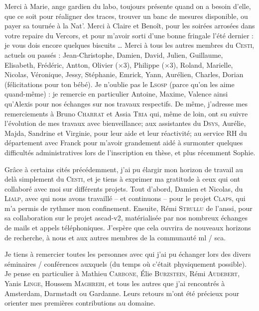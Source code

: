Merci à Marie, ange gardien du labo, toujours présente quand on a besoin d'elle, que ce soit pour réaligner des traces, trouver un banc de mesures disponible, ou payer sa tournée à la Nat'.
Merci à Claire et Benoît, pour les soirées arrosées dans votre repaire du Vercors, et pour m'avoir sorti d'une bonne fringale l'été dernier : je vous dois encore quelques biscuits \ldots
Merci à tous les autres membres du \textsc{Cesti}, actuels ou passés : Jean-Christophe, Damien, David, Julien, Guillaume, Elisabeth, Frédéric, Antton, Olivier (\(\times 3\)), Philippe (\(\times 3\)), Roland, Marielle, Nicolas, Véronique, Jessy, Stéphanie, Emrick, Yann, Aurélien, Charles, Dorian (félicitations pour ton bébé).
Je n'oublie pas le \textsc{Lsosp} (parce qu'on les aime quand-même) : je remercie en particulier Antoine, Maxime, Valence ainsi qu'Alexis pour nos échanges sur nos travaux respectifs.
De même, j'adresse mes remerciements à Bruno \textsc{Charrat} et Assia \textsc{Tria} qui, même de loin, ont su suivre l'évolution de mes travaux avec bienveillance; aux assistantes du \textsc{Dsys}, Aurélie, Majda, Sandrine et Virginie, pour leur aide et leur réactivité; au service RH du département avec Franck pour m'avoir grandement aidé à surmonter quelques difficultés administratives lors de l'inscription en thèse, et plus récemment Sophie.

Grâce à certains cités précédemment, j'ai pu élargir mon horizon de travail au delà simplement du \textsc{Cesti}, et je tiens à exprimer ma gratitude à ceux qui ont collaboré avec moi sur différents projets.
Tout d'abord, Damien et Nicolas, du \textsc{Lialp}, avec qui nous avons travaillé -- et continuons -- pour le projet \textsc{Claps}, qui m'a permis de rythmer mon confinement.
Ensuite, Rémi \textsc{Strullu} de l'\acrshort{anssi}, pour sa collaboration sur le projet \acrshort{ascad}-v2, matérialisée par nos nombreux échanges de mails et appels téléphoniques.
J'espère que cela ouvrira de nouveaux horizons de recherche, à nous et aux autres membres de la communauté \acrshort{ml} / \acrshort{sca}.

Je tiens à remercier toutes les personnes avec qui j'ai pu échanger lors des divers séminaires / conférences auxquels (du temps où c'était physiquement possible).
Je pense en particulier à Mathieu \textsc{Carbone}, Élie \textsc{Burzstein}, Rémi \textsc{Audebert}, Yanis \textsc{Linge}, Houssem \textsc{Maghrebi}, et tous les autres que j'ai rencontrés à Amsterdam, Darmstadt ou Gardanne.
Leurs retours m'ont été précieux pour orienter mes premières contributions au domaine.

